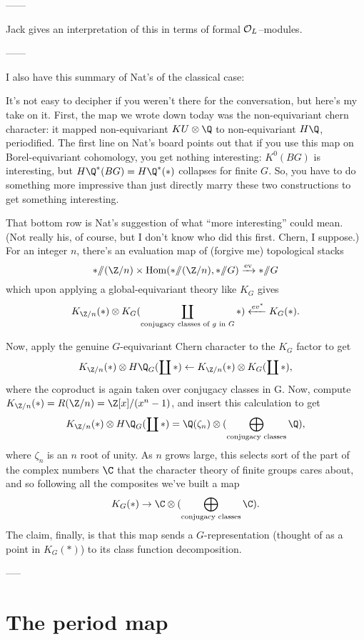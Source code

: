 ------

Jack gives an interpretation of this in terms of formal $\mathcal{O}_L$--modules.

------

I also have this summary of Nat's of the classical case:

It's not easy to decipher if you weren't there for the conversation, but here's my take on it. First, the map we wrote down today was the non-equivariant chern character: it mapped non-equivariant $KU \otimes \Q$ to non-equivariant $H\Q$, periodified. The first line on Nat's board points out that if you use this map on Borel-equivariant cohomology, you get nothing interesting: $K^0(BG)$ is interesting, but $H\Q^*(BG) = H\Q^*(*)$ collapses for finite $G$. So, you have to do something more impressive than just directly marry these two constructions to get something interesting.

That bottom row is Nat's suggestion of what ``more interesting'' could mean. (Not really his, of course, but I don't know who did this first. Chern, I suppose.) For an integer $n$, there's an evaluation map of (forgive me) topological stacks \[* \mmod (\Z/n) \times \operatorname{Hom}(* \mmod (\Z/n), * \mmod G) \xrightarrow{\mathrm{ev}} * \mmod G\] which upon applying a global-equivariant theory like $K_G$ gives \[K_{\Z/n}(*) \otimes K_G(\coprod_{\text{conjugacy classes of $g$ in $G$}} *) \xleftarrow{ev^*} K_G(*).\]

Now, apply the genuine $G$-equivariant Chern character to the $K_G$ factor to get \[K_{\Z/n}(*) \otimes H\Q_G(\coprod *) \from K_{\Z/n}(*) \otimes K_G(\coprod *),\] where the coproduct is again taken over conjugacy classes in G. Now, compute $K_{\Z/n}(*) = R(\Z/n) = \Z[x] / (x^n - 1)$, and insert this calculation to get \[K_{\Z/n}(*) \otimes H\Q_G(\coprod *) = \Q(\zeta_n) \otimes (\bigoplus_{\text{conjugacy classes}} \Q),\] where $\zeta_n$ is an $n${\th} root of unity.  As $n$ grows large, this selects sort of the part of the complex numbers $\C$ that the character theory of finite groups cares about, and so following all the composites we've built a map \[K_G(*) \to \C \otimes (\bigoplus_{\text{conjugacy classes}} \C).\]  The claim, finally, is that this map sends a $G$-representation (thought of as a point in $K_G(*)$) to its class function decomposition.


-----




\section{The period map}

